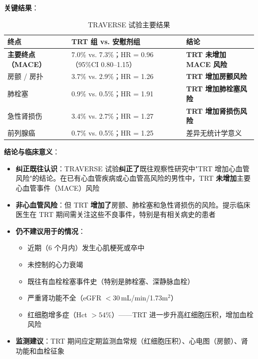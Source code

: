 \vspace{0.5em}
\noindent\textbf{关键结果}：

\begin{table}[htbp]
\centering
\caption{TRAVERSE 试验主要结果}
\label{tab:traverse_results}
\begin{tabularx}{\textwidth}{@{}lXX@{}}
    \toprule
    \textbf{终点} & \textbf{TRT 组 vs. 安慰剂组} & \textbf{结论} \\
    \midrule
    \textbf{主要终点（MACE）} & 7.0\% vs. 7.3\%；HR = 0.96（95\%CI 0.80--1.15） & \textbf{TRT 未增加 MACE 风险} \\
    房颤 / 房扑 & 3.7\% vs. 2.9\%；HR = 1.26 & \textbf{TRT 增加房颤风险} \\
    肺栓塞 & 0.9\% vs. 0.5\%；HR = 1.91 & \textbf{TRT 增加肺栓塞风险} \\
    急性肾损伤 & 3.4\% vs. 2.7\%；HR = 1.27 & \textbf{TRT 增加肾损伤风险} \\
    前列腺癌 & 0.7\% vs. 0.5\%；HR = 1.25 & 差异无统计学意义 \\
    \bottomrule
\end{tabularx}
\end{table}

\vspace{0.5em}
\noindent\textbf{结论与临床意义}：

\begin{itemize}[leftmargin=2cm]
	\item \textbf{纠正既往认识}：TRAVERSE 试验\textbf{纠正了}既往观察性研究中"TRT 增加心血管风险"的结论。在已有心血管疾病或心血管高风险的男性中，TRT \textbf{未增加}主要心血管事件（MACE）风险
	\item \textbf{非心血管风险}：但 TRT \textbf{增加了}房颤、肺栓塞和急性肾损伤的风险。提示临床医生在 TRT 期间需关注这些不良事件，特别是有相关病史的患者
	\item \textbf{仍不建议用于的情况}：
	\begin{itemize}
		\item 近期（6 个月内）发生心肌梗死或卒中
		\item 未控制的心力衰竭
		\item 既往有血栓栓塞事件史（特别是肺栓塞、深静脉血栓）
		\item 严重肾功能不全（eGFR $<30\,$mL/min/1.73m$^2$）
		\item 红细胞增多症（Hct $>54\%$）——TRT 进一步升高红细胞压积，增加血栓风险
	\end{itemize}
	\item \textbf{监测建议}：TRT 期间应定期监测血常规（红细胞压积）、心电图（房颤）、肾功能和血栓征象
\end{itemize}

